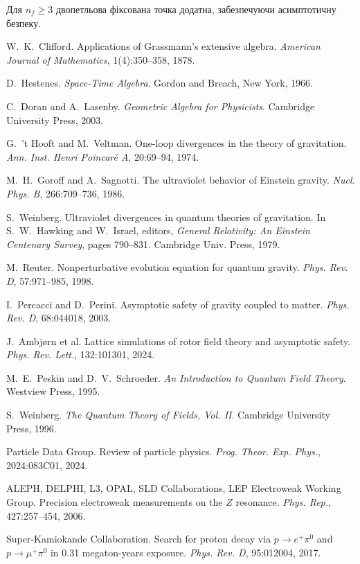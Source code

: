\documentclass[11pt,a4paper]{article}
\numberwithin{equation}{section}
\theoremstyle{plain}
\theoremstyle{definition}
\theoremstyle{remark}
\begin{document}
Для $n_f\geq 3$ двопетльова фіксована точка додатна, забезпечуючи асимптотичну безпеку.

\vspace{1em}

\begin{thebibliography}{99}

W.~K.~Clifford.
\newblock Applications of Grassmann's extensive algebra.
\newblock \emph{American Journal of Mathematics}, 1(4):350--358, 1878.

D.~Hestenes.
\newblock \emph{Space-Time Algebra}.
\newblock Gordon and Breach, New York, 1966.

C.~Doran and A.~Lasenby.
\newblock \emph{Geometric Algebra for Physicists}.
\newblock Cambridge University Press, 2003.

G.~'t Hooft and M.~Veltman.
\newblock One-loop divergences in the theory of gravitation.
\newblock \emph{Ann. Inst. Henri Poincar\'e A}, 20:69--94, 1974.

M.~H.~Goroff and A.~Sagnotti.
\newblock The ultraviolet behavior of Einstein gravity.
\newblock \emph{Nucl. Phys. B}, 266:709--736, 1986.

S.~Weinberg.
\newblock Ultraviolet divergences in quantum theories of gravitation.
\newblock In S.~W.~Hawking and W.~Israel, editors, \emph{General Relativity: An Einstein Centenary Survey}, pages 790--831. Cambridge Univ. Press, 1979.

M.~Reuter.
\newblock Nonperturbative evolution equation for quantum gravity.
\newblock \emph{Phys. Rev. D}, 57:971--985, 1998.

I.~Percacci and D.~Perini.
\newblock Asymptotic safety of gravity coupled to matter.
\newblock \emph{Phys. Rev. D}, 68:044018, 2003.

J.~Ambj{\o}rn et al.
\newblock Lattice simulations of rotor field theory and asymptotic safety.
\newblock \emph{Phys. Rev. Lett.}, 132:101301, 2024.

M.~E.~Peskin and D.~V.~Schroeder.
\newblock \emph{An Introduction to Quantum Field Theory}.
\newblock Westview Press, 1995.

S.~Weinberg.
\newblock \emph{The Quantum Theory of Fields, Vol. II}.
\newblock Cambridge University Press, 1996.

Particle Data Group.
\newblock Review of particle physics.
\newblock \emph{Prog. Theor. Exp. Phys.}, 2024:083C01, 2024.

ALEPH, DELPHI, L3, OPAL, SLD Collaborations, LEP Electroweak Working Group.
\newblock Precision electroweak measurements on the $Z$ resonance.
\newblock \emph{Phys. Rep.}, 427:257--454, 2006.

Super-Kamiokande Collaboration.
\newblock Search for proton decay via $p\to e^+\pi^0$ and $p\to\mu^+\pi^0$ in 0.31 megaton-years exposure.
\newblock \emph{Phys. Rev. D}, 95:012004, 2017.

\end{thebibliography}
\end{document}
